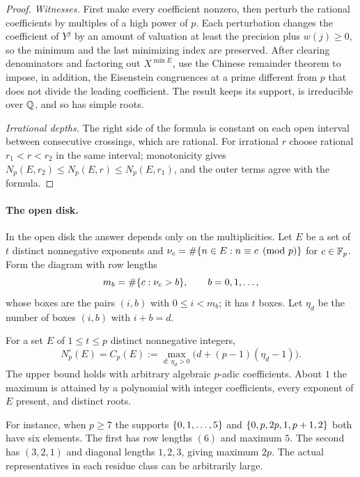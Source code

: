 \begin{proof}
\emph{Witnesses.} First make every coefficient nonzero, then perturb the rational
coefficients by multiples of a high power of $p$. Each perturbation changes the
coefficient of $Y^j$ by an amount of valuation at least the precision plus $w(j)\ge0$, so
the minimum and the last minimizing index are preserved. After clearing denominators and
factoring out $X^{\min E}$, use the Chinese remainder theorem to impose, in addition, the
Eisenstein congruences at a prime different from $p$ that does not divide the leading
coefficient. The result keeps its support, is irreducible over $\mathbb{Q}$, and so has simple
roots.

\emph{Irrational depths.} The right side of the formula is constant on each open interval
between consecutive crossings, which are rational. For irrational $r$ choose rational
$r_1<r<r_2$ in the same interval; monotonicity gives
$N_p(E,r_2)\le N_p(E,r)\le N_p(E,r_1)$, and the outer terms agree with the formula.
\end{proof}

\paragraph{The open disk.}
In the open disk the answer depends only on the multiplicities. Let $E$ be a set of $t$
distinct nonnegative exponents and $\nu_c=\#\{n\in E : n\equiv c\pmod p\}$ for
$c\in\mathbb{F}_p$. Form the diagram with row lengths
\[
 m_b=\#\{c : \nu_c>b\},\qquad b=0,1,\dots,
\]
whose boxes are the pairs $(i,b)$ with $0\le i<m_b$; it has $t$ boxes. Let $\eta_d$ be the
number of boxes $(i,b)$ with $i+b=d$.

\begin{theorem}\label{smd:thm:fixedsupport}
For a set $E$ of $1\le t\le p$ distinct nonnegative integers,
\[
 N^\circ_p(E)=C_p(E):=\max_{d:\,\eta_d>0}\bigl(d+(p-1)(\eta_d-1)\bigr).
\]
The upper bound holds with arbitrary algebraic $p$-adic coefficients. About $1$ the maximum
is attained by a polynomial with integer coefficients, every exponent of $E$ present, and
distinct roots.
\end{theorem}

For instance, when $p\ge7$ the supports $\{0,1,\dots,5\}$ and $\{0,p,2p,1,p+1,2\}$ both
have six elements. The first has row lengths $(6)$ and maximum $5$. The second has
$(3,2,1)$ and diagonal lengths $1,2,3$, giving maximum $2p$. The actual representatives in
each residue class can be arbitrarily large.

